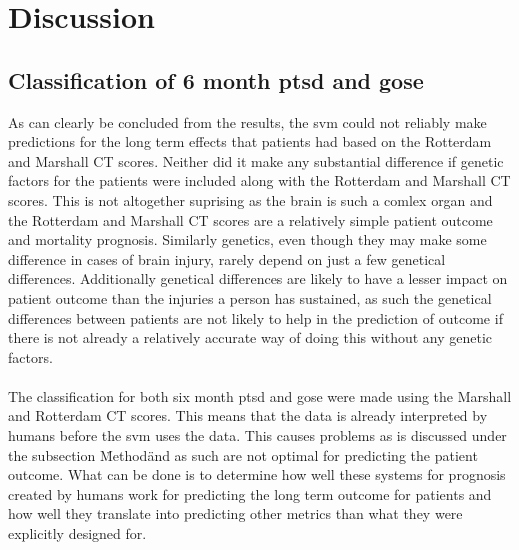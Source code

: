 \documentclass[11pt]{article}
\begin{document}
\section{Discussion}

\subsection{Classification of 6 month \gls{ptsd} and \gls{gose}}
As can clearly be concluded from the results, the \gls{svm} could not reliably make predictions for the long term effects that patients had based on the Rotterdam and Marshall CT scores. Neither did it make any substantial difference if genetic factors for the patients were included along with the Rotterdam and Marshall CT scores. This is not altogether suprising as the brain is such a comlex organ and the Rotterdam and Marshall CT scores are a relatively simple patient outcome and mortality prognosis. Similarly genetics, even though they may make some difference in cases of brain injury, rarely depend on just a few genetical differences. Additionally genetical differences are likely to have a lesser impact on patient outcome than the injuries a person has sustained, as such the genetical differences between patients are not likely to help in the prediction of outcome if there is not already a relatively accurate way of doing this without any genetic factors.\\
\\
The classification for both six month \gls{ptsd} and \gls{gose} were made using the Marshall and Rotterdam CT scores. This means that the data is already interpreted by humans before the \gls{svm} uses the data. This causes problems as is discussed under the subsection \"Method\" and as such are not optimal for predicting the patient outcome. What can be done is to determine how well these systems for prognosis created by humans work for predicting the long term outcome for patients and how well they translate into predicting other metrics than what they were explicitly designed for.
\end{document}
